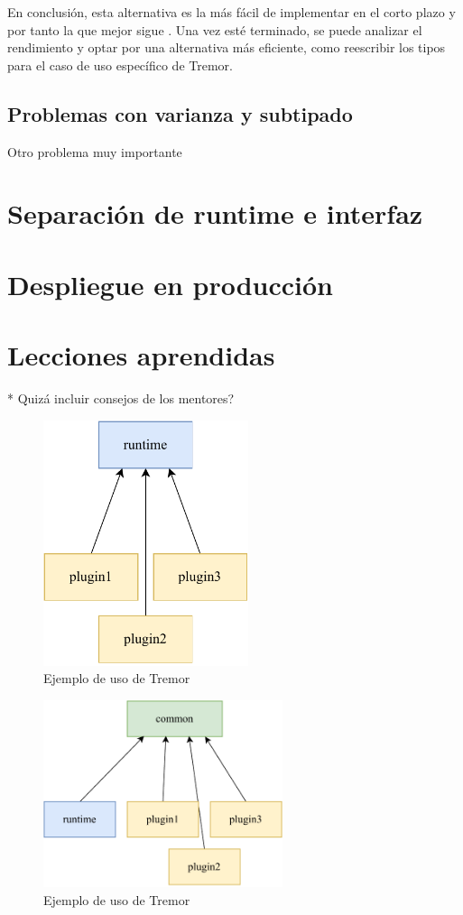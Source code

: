 En conclusión, esta alternativa es la más fácil de implementar en el corto
plazo y por tanto la que mejor sigue \work. Una vez esté terminado, se puede
analizar el rendimiento y optar por una alternativa más eficiente, como
reescribir los tipos para el caso de uso específico de Tremor.

\subsection{Problemas con varianza y subtipado}

Otro problema muy importante 

\section{Separación de runtime e interfaz}

\section{Despliegue en producción}

\section{Lecciones aprendidas}

* Quizá incluir consejos de los mentores?

\begin{figure}
    \centering
    \includegraphics[width=6cm]{./Imagenes/separation-temporary.pdf}
    \caption{Ejemplo de uso de Tremor}%
    \label{fig:separation_temporary}
\end{figure}

\begin{figure}
    \centering
    \includegraphics[width=7cm]{./Imagenes/separation.pdf}
    \caption{Ejemplo de uso de Tremor}%
    \label{fig:separation}
\end{figure}

